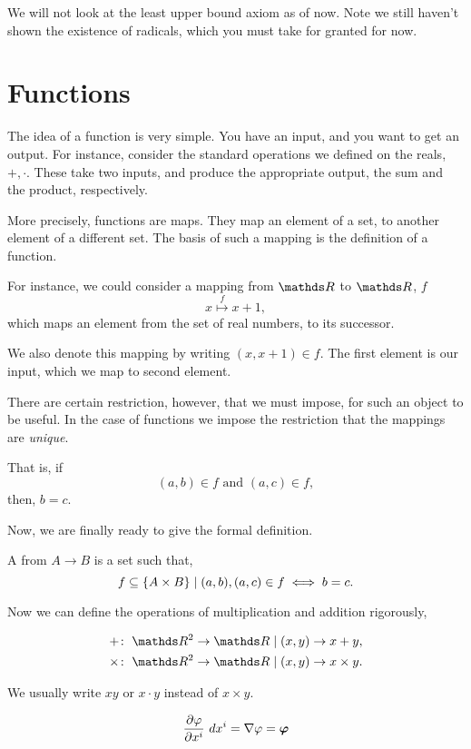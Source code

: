 We will not look at the least upper bound axiom as of now. Note we still haven't 
shown the existence of radicals, which you must take for granted for now.

\section{Functions}

The idea of a function is very simple. You have an input, and you want to get 
an output. For instance, consider the standard operations we defined on the reals,
\(+, \cdot\). These take two inputs, and produce the appropriate output, the sum 
and the product, respectively.

More precisely, functions are maps. They map an element of a set, to another 
element of a different set. The basis of such a mapping is the definition of a 
function.

For instance, we could consider a mapping from \(\RR\) to \(\RR\), \(f\) 
\begin{equation*}
    x \overset{f}{\mapsto} x + 1,
\end{equation*}
which maps an element from the set of real numbers, to its successor.

We also denote this mapping by writing \((x, x + 1) \in f\). The first element 
is our input, which we map to second element. 

There are certain restriction, however, that we must impose, for such an object 
to be useful. In the case of functions we impose the restriction 
that the mappings are \emph{unique}. 

That is, if 
\begin{equation*}
    (a, b) \in f \text{ and } (a, c) \in f, 
\end{equation*}
then, \(b = c\).

Now, we are finally ready to give the formal definition.

\begin{definition}
    A  from \(A \to B\) is a set such that,
    \begin{equation}
        f \subseteq \left\{A \times B\right\} \mid (a, b), (a, c) \in f \iff b = c.
    \end{equation}
\end{definition}

Now we can define the operations of multiplication and addition rigorously, 

\begin{align*}
    + \colon \; &\RR^2 \to \RR \given (x, y) \to x + y, \\
    \times \colon \; &\RR^2 \to \RR \given (x, y) \to x \times y.
\end{align*}

We usually write \(xy\) or \(x \cdot y\) instead of \(x \times y\).

\begin{equation}
    \pdv{\varphi}{x^i} \mathop{}{d}{x^i} = \nabla \varphi = \boldsymbol{\mathbf{\varphi}} 
\end{equation}
